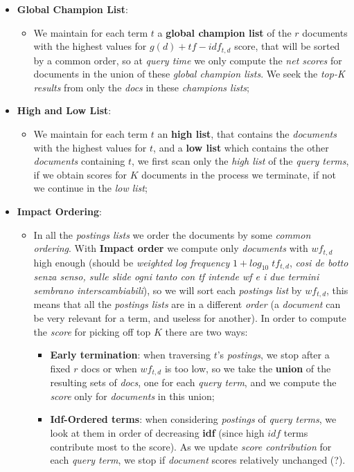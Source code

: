 \documentclass{article}
\begin{document}
\begin{itemize}
\item \textbf{Global Champion List}: 
\begin{itemize}
\item We maintain for each term $t$ a \textbf{global champion list} of the $r$ documents with the highest values for $g(d) + tf-idf_{t,d}$ score, that will be sorted by a common order, so at \emph{query time} we only compute the \emph{net scores} for documents in the union of these \emph{global champion lists}. We seek the \emph{top-K results} from only the \emph{docs} in these \emph{champions lists};
\end{itemize}
\item \textbf{High and Low List}:
\begin{itemize}
\item We maintain for each term $t$ an \textbf{high list}, that contains the \emph{documents} with the highest values for $t$, and a \textbf{low list} which contains the other \emph{documents} containing $t$, we first scan only the \emph{high list} of the \emph{query terms}, if we obtain scores for $K$ documents in the process we terminate, if not we continue in the \emph{low list};
\end{itemize}
\item \textbf{Impact Ordering}:
\begin{itemize}
\item In all the \emph{postings lists }we order the documents by some \emph{common ordering}. With \textbf{Impact order }we compute only \emph{documents} with $wf_{t,d}$ high enough (should be \emph{weighted log frequency} $1+ log_{10}\; tf_{t,d}$, \emph{cosi de botto senza senso, sulle slide ogni tanto con tf intende wf e i due termini sembrano interscambiabili}), so we will sort each \emph{postings list} by $wf_{t,d}$, this means that all the \emph{postings lists} are in a different \emph{order} (a \emph{document} can be very relevant for a term, and useless for another). In order to compute the \emph{score} for picking off top $K$ there are two ways:
\begin{itemize} 
\item \textbf{Early termination}: when traversing $t$'s \emph{postings}, we stop after a fixed $r$ docs or when $wf_{t,d}$ is too low, so we take the \textbf{union} of the resulting sets of \emph{docs}, one for each \emph{query term}, and we compute the \emph{score} only for \emph{documents} in this union;
\item \textbf{Idf-Ordered terms}: when considering \emph{postings} of \emph{query terms}, we look at them in order of decreasing \textbf{idf} (since high $idf$ terms contribute most to the score). As we update \emph{score contribution} for each \emph{query term}, we stop if \emph{document} scores relatively unchanged (?).
\end{itemize}
\end{itemize}
\end{itemize}
\end{document}
